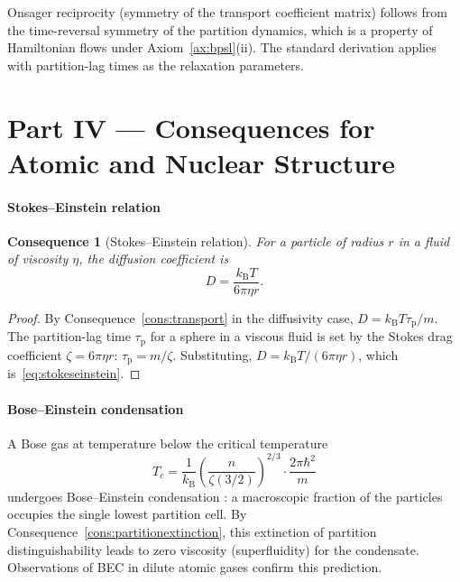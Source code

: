\documentclass[11pt,twocolumn,a4paper]{article}
\theoremstyle{axiomstyle}
\theoremstyle{conseqstyle}
\newtheorem{consequence}{Consequence}
\theoremstyle{definition}
\theoremstyle{remark}
\newcommand{\kB}{k_{\mathrm{B}}}
\newcommand{\taup}{\tau_{\mathrm{p}}}
\begin{document}
Onsager reciprocity (symmetry of the transport coefficient matrix) follows from the time-reversal symmetry of the partition dynamics, which is a property of Hamiltonian flows under Axiom~\ref{ax:bpsl}(ii). The standard derivation applies with partition-lag times as the relaxation parameters.

\clearpage

\part*{Part IV --- Consequences for Atomic and Nuclear Structure}

\subsection{Stokes--Einstein relation}

\begin{consequence}[Stokes--Einstein relation]
\label{cons:stokeseinstein}
For a particle of radius $r$ in a fluid of viscosity $\eta$, the diffusion coefficient is
\begin{equation}
D=\frac{\kB T}{6\pi\eta r}.
\label{eq:stokeseinstein}
\end{equation}
\end{consequence}

\begin{proof}
By Consequence~\ref{cons:transport} in the diffusivity case, $D=\kB T\taup/m$. The partition-lag time $\taup$ for a sphere in a viscous fluid is set by the Stokes drag coefficient $\zeta=6\pi\eta r$: $\taup=m/\zeta$. Substituting, $D=\kB T/(6\pi\eta r)$, which is~\eqref{eq:stokeseinstein}.
\end{proof}

\subsection{Bose--Einstein condensation}

A Bose gas at temperature below the critical temperature
\begin{equation*}
T_{c}=\frac{1}{\kB}\left(\frac{n}{\zeta(3/2)}\right)^{2/3}\cdot\frac{2\pi\hbar^{2}}{m}
\end{equation*}
undergoes Bose--Einstein condensation \citep{bose1924,andersonetal1995}: a macroscopic fraction of the particles occupies the single lowest partition cell. By Consequence~\ref{cons:partitionextinction}, this extinction of partition distinguishability leads to zero viscosity (superfluidity) for the condensate. Observations of BEC in dilute atomic gases \citep{andersonetal1995} confirm this prediction.
\end{document}
